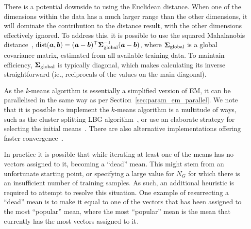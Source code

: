 There is a potential downside to using the Euclidean distance.
When one of the dimensions within the data has a much larger range than the other dimensions,
it will dominate the contribution to the distance result, with the other dimensions effectively ignored.
To address this, it is possible to use the squared Mahalanobis distance~\cite{Bishop_2006,Duda01},
\mbox{$\operatorname{dist}({\boldsymbol{a}}, {\boldsymbol{b}}) = ({\boldsymbol{a}} - {\boldsymbol{b}})^\top {\boldsymbol{\Sigma}}^{-1}_{\mathrm{global}} ({\boldsymbol{a}} - {\boldsymbol{b}})$},
where ${\boldsymbol{\Sigma}}_{\mathrm{global}}$ is a global covariance matrix, estimated from all available training data.
To maintain efficiency, ${\boldsymbol{\Sigma}}_{\mathrm{global}}$ is typically diagonal,
which makes calculating its inverse straightforward (ie., reciprocals of the values on the main diagonal).

As the {\it k}-means algorithm is essentially a simplified version of EM,
it can be parallelised in the same way as per Section~\ref{sec:param_em_parallel}.
We note that it is possible to implement the $k$-means algorithm is a multitude of ways,
such as the cluster splitting LBG algorithm~\cite{Linde80},
or use an elaborate strategy for selecting the initial means~\cite{Arthur_2007}.
There are also alternative implementations offering faster convergence~\cite{Elkan_2003}.



In practice it is possible that while iterating at least one of the means has no vectors assigned to it,
becoming a ``dead'' mean.
This might stem from an unfortunate starting point, 
or specifying a large value for $N_G$ for which there is an insufficient number of training samples.
As such, an additional heuristic is required to attempt to resolve this situation.
One example of resurrecting a ``dead'' mean is to make it equal to one of the vectors
that has been assigned to the most ``popular'' mean,
where the most ``popular'' mean is the mean that currently has the most vectors assigned to it.



